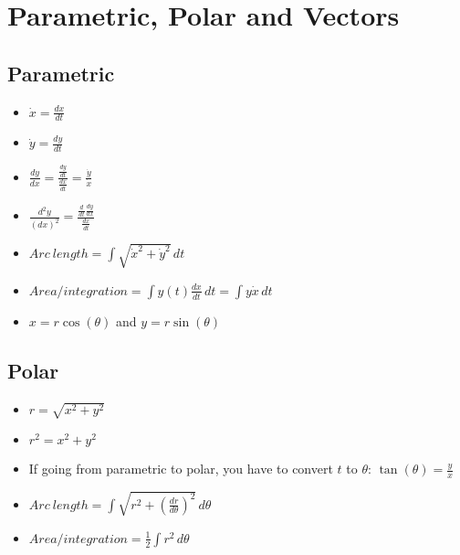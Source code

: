 \documentclass{article}
\begin{document}
\section*{\color{Gray}Parametric, Polar and Vectors}
  \begin{multicols}{2}
  \subsection*{\color{BrickRed}Parametric}
  \begin{itemize}
   \item \( \dot{x}=\frac{dx}{dt}\)\\
   \item \( \dot{y}=\frac{dy}{dt}\)\\
   \item
     \(\frac{dy}{dx}=\frac{\frac{dy}{dt}}{\frac{dx}{dt}}=\frac{\dot{y}}{\dot{x}}\) 
   \item
     \( \frac{d^2y}{\left(dx\right)^2} = \frac{\frac{d}{dt}\frac{dy}{dx}}{\frac{dx}{dt}} \)\\
   \item \(Arc ~ length = \int\sqrt{\dot{x}^2+\dot{y}^2} \, dt\)\\
   \item \(Area/integration = \int y(t) \frac{dx}{dt} \, dt = \int y \dot{x} \, dt \)\\
   \item \(x=r\cos(\theta)\) and \(y=r\sin(\theta)\)\\
  \end{itemize}
  \columnbreak
  \subsection*{\color{BrickRed}Polar}
  \begin{itemize}
   \item \(r=\sqrt{x^2+y^2}\)\\
   \item \( r^2=x^2+y^2 \)\\
   \item If going from parametric to polar, you have to convert
      \(t\) to \(\theta\): \(\tan(\theta)=\frac{y}{x}\)\\
   \item \(Arc ~ length = \int \sqrt{r^2+\left( \frac{dr}{d\theta}
     \right)^2} \, d\theta\)
   \item \(Area/integration = \frac{1}{2} \int r^2 \, d\theta \)\\
  \end{itemize}
\end{multicols}
\end{document}
